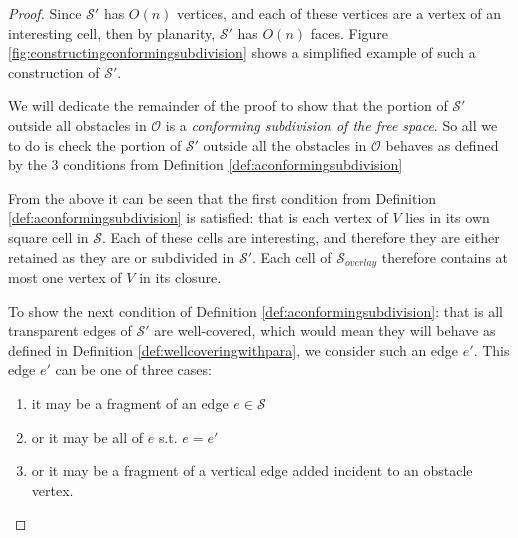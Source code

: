 \begin{proof}
Since $\mathcal{S}'$ has $O(n)$ vertices, and each of these vertices are a vertex of an 
interesting cell, then by planarity, $\mathcal{S}'$ has $O(n)$ faces. Figure 
\ref{fig:constructingconformingsubdivision} shows a simplified example of such a construction 
of $\mathcal{S}'$. 


We will dedicate the remainder of the proof to show that the portion of $\mathcal{S}'$ outside 
all obstacles in $\mathcal{O}$ is a \textit{conforming subdivision of the free space}. So all we
to do is check the portion of $\mathcal{S}'$ outside all the obstacles in $\mathcal{O}$ behaves 
as defined by the 3 conditions from Definition \ref{def:aconformingsubdivision}

From the above it can be seen that the first condition from Definition \ref{def:aconformingsubdivision} 
is satisfied: that is each vertex of $V$ lies in its own square cell in $\mathcal{S}$. Each of 
these cells are interesting, and therefore they are either retained as they are or subdivided
in $\mathcal{S}'$. Each cell of $\mathcal{S}_{overlay}$ therefore contains at most one vertex 
of $V$ in its closure. 

To show the next condition of Definition \ref{def:aconformingsubdivision}: that is all 
transparent edges of $\mathcal{S}'$ are well-covered, which would mean they will behave as 
defined in Definition \ref{def:wellcoveringwithpara}, we consider such an edge $e'$. This 
edge $e'$ can be one of three cases: 

\begin{enumerate}
\item it may be a fragment of an edge $e\in\mathcal{S}$
\item or it may be all of $e$ s.t. $e=e'$
\item or it may be a fragment of a vertical edge added incident to an obstacle vertex.
\end{enumerate}


\end{proof}
